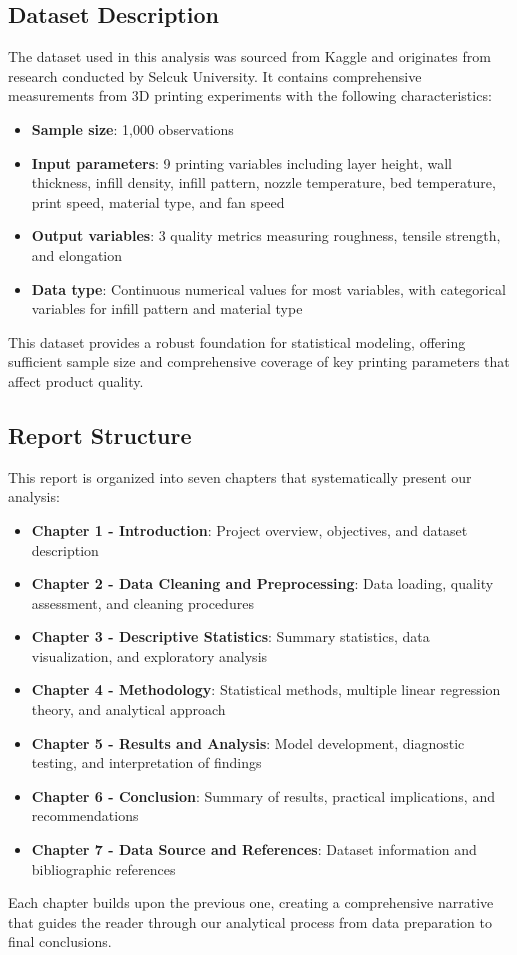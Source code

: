 \subsection{Dataset Description}

The dataset used in this analysis was sourced from Kaggle and originates from research conducted by Selcuk University. It contains comprehensive measurements from 3D printing experiments with the following characteristics:

\begin{itemize}
    \item \textbf{Sample size}: 1,000 observations
    \item \textbf{Input parameters}: 9 printing variables including layer height, wall thickness, infill density, infill pattern, nozzle temperature, bed temperature, print speed, material type, and fan speed
    \item \textbf{Output variables}: 3 quality metrics measuring roughness, tensile strength, and elongation
    \item \textbf{Data type}: Continuous numerical values for most variables, with categorical variables for infill pattern and material type
\end{itemize}

This dataset provides a robust foundation for statistical modeling, offering sufficient sample size and comprehensive coverage of key printing parameters that affect product quality.

\subsection{Report Structure}

This report is organized into seven chapters that systematically present our analysis:

\begin{itemize}
    \item \textbf{Chapter 1 - Introduction}: Project overview, objectives, and dataset description
    \item \textbf{Chapter 2 - Data Cleaning and Preprocessing}: Data loading, quality assessment, and cleaning procedures
    \item \textbf{Chapter 3 - Descriptive Statistics}: Summary statistics, data visualization, and exploratory analysis
    \item \textbf{Chapter 4 - Methodology}: Statistical methods, multiple linear regression theory, and analytical approach
    \item \textbf{Chapter 5 - Results and Analysis}: Model development, diagnostic testing, and interpretation of findings
    \item \textbf{Chapter 6 - Conclusion}: Summary of results, practical implications, and recommendations
    \item \textbf{Chapter 7 - Data Source and References}: Dataset information and bibliographic references
\end{itemize}

Each chapter builds upon the previous one, creating a comprehensive narrative that guides the reader through our analytical process from data preparation to final conclusions.